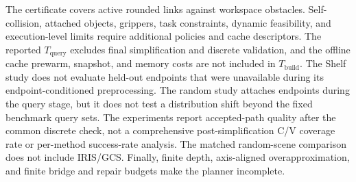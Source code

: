 \documentclass[journal]{IEEEtran}
\newcommand{\Tbuild}{\ensuremath{T_{\mathrm{build}}}}
\newcommand{\Tquery}{\ensuremath{T_{\mathrm{query}}}}
\begin{document}
The certificate covers active rounded links against workspace obstacles.
Self-collision, attached objects, grippers, task constraints, dynamic
feasibility, and execution-level limits require additional policies and cache
descriptors. The reported $\Tquery$ excludes final simplification and discrete
validation, and the offline cache prewarm, snapshot, and memory costs are not
included in $\Tbuild$. The Shelf study does not evaluate held-out endpoints that
were unavailable during its endpoint-conditioned preprocessing. The random
study attaches endpoints during the query stage, but it does not test a
distribution shift beyond the fixed benchmark query sets. The experiments
report accepted-path quality after the common discrete check, not a
comprehensive post-simplification C/V coverage rate or per-method
success-rate analysis. The matched random-scene comparison does not include
IRIS/GCS. Finally, finite depth, axis-aligned overapproximation, and finite
bridge and repair budgets make the planner incomplete.
\end{document}
